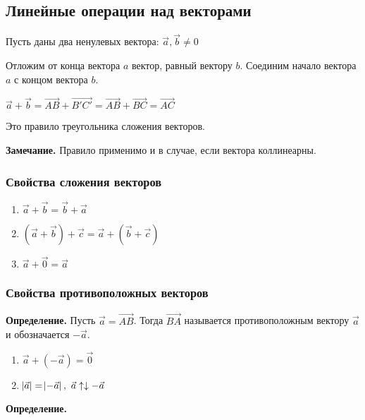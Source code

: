 \documentclass{article}
\begin{document}
    \subsection{Линейные операции над векторами}

    Пусть даны два ненулевых вектора: \( \overrightarrow{a}, \overrightarrow{b} \neq 0 \)
    
    Отложим от конца вектора $a$ вектор, равный вектору $b$. Соединим начало вектора $a$ с концом вектора $b$.
    
    \( \overrightarrow{a} + \overrightarrow{b} = \overrightarrow{AB} + \overrightarrow{B'C'} = \overrightarrow{AB} + \overrightarrow{BC} = \overrightarrow{AC} \)

    Это правило треугольника сложения векторов.

    \textbf{Замечание.} Правило применимо и в случае, если вектора коллинеарны.
    
    \subsubsection{Свойства сложения векторов}
    
    \begin{enumerate}
        \item \(\vec{a} + \vec{b} = \vec{b} + \vec{a}\)
        \item \((\vec{a} + \vec{b}) + \vec{c} = \vec{a} + (\vec{b} + \vec{c})\)
        \item \(\vec{a} + \vec{0} = \vec{a}\)
    \end{enumerate}

    \subsubsection{Свойства противоположных векторов}

    \textbf{Определение.} Пусть \(\vec{a} = \vec{AB}\). Тогда \(\vec{BA}\) называется противоположным вектору \(\vec{a}\) и обозначается \(-\vec{a}\).

    \begin{enumerate}
        \item \(\vec{a} + (-\vec{a}) = \vec{0}\)
        \item \(\abs{\vec{a}}=\abs{-\vec{a}},\ \vec{a} \uparrow\downarrow -\vec{a}\)
    \end{enumerate}

    \textbf{Определение.} %
\end{document}
